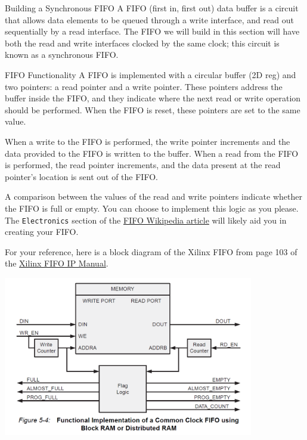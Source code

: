 \documentclass[11pt]{article}
\makeatletter
\renewcommand{\section}
{\@startsection {section}{1}{0pt}
 {-2ex}
 {1ex}
 {\bfseries\Large}}
\renewcommand{\subsection}
{\@startsection {subsection}{1}{0pt}
 {-1ex}
 {0.5ex}
 {\bfseries\normalsize}}
\makeatother
\begin{document}
\section{Building a Synchronous FIFO}
A FIFO (first in, first out) data buffer is a circuit that allows data elements to be queued through a write interface, and read out sequentially by a read interface.
The FIFO we will build in this section will have both the read and write interfaces clocked by the same clock; this circuit is known as a synchronous FIFO.

\subsection{FIFO Functionality}
A FIFO is implemented with a circular buffer (2D reg) and two pointers: a read pointer and a write pointer.
These pointers address the buffer inside the FIFO, and they indicate where the next read or write operation should be performed.
When the FIFO is reset, these pointers are set to the same value.

When a write to the FIFO is performed, the write pointer increments and the data provided to the FIFO is written to the buffer.
When a read from the FIFO is performed, the read pointer increments, and the data present at the read pointer's location is sent out of the FIFO.

A comparison between the values of the read and write pointers indicate whether the FIFO is full or empty.
You can choose to implement this logic as you please.
The \verb|Electronics| section of the \href{https://en.wikipedia.org/wiki/FIFO_(computing_and_electronics)}{FIFO Wikipedia article} will likely aid you in creating your FIFO.

For your reference, here is a block diagram of the Xilinx FIFO from page 103 of the \href{https://www.xilinx.com/support/documentation/ip_documentation/fifo_generator_ug175.pdf}{Xilinx FIFO IP Manual}.

\begin{center}
    \includegraphics[height=7cm]{figs/sync_fifo_diagram.png}
\end{center}
\end{document}
